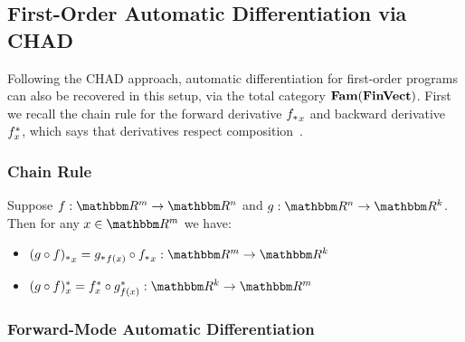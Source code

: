 \subsection{First-Order Automatic Differentiation via CHAD}

Following the CHAD approach, automatic differentiation for first-order programs can also be recovered in this
setup, via the total category $\mathbf{Fam}(\mathbf{FinVect})$. First we recall the chain rule for the forward derivative
${f_{*}}_x$ and backward derivative $f^{*}_x$, which says that derivatives respect
composition~\cite{spivak65}.

%
%

\subsubsection{Chain Rule}

Suppose $f: \RR^m \to \RR^n$ and $g: \RR^n \to \RR^k$. Then
for any $x \in \RR^m$ we have:

\begin{itemize}
\item $\pushf{(g \comp f)}_x = \pushf{g}_{f(x)} \comp \pushf{f}_x: \RR^m \to \RR^k$
\item $\pullf{(g \comp f)}_x = \pullf{f}_{x} \comp \pullf{g}_{f(x)}: \RR^k \to \RR^m$
\end{itemize}

\subsubsection{Forward-Mode Automatic Differentiation}

